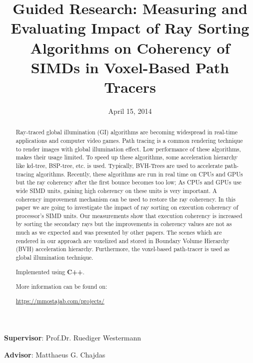 \documentclass[]{article}
\title{Guided Research: Measuring and Evaluating Impact of Ray Sorting Algorithms on Coherency of SIMDs in Voxel-Based Path Tracers}
\date{April 15, 2014}
\begin{document}
\maketitle

\begin{description}
	\centering
	\item[] \textbf{Supervisor}: Prof.Dr. Ruediger Westermann
	\item[] \textbf{Advisor}: Matthaeus G. Chajdas
\end{description}
	
	


\begin{abstract}

Ray-traced global illumination (GI) algorithms are becoming widespread in real-time applications and computer video games. Path tracing is a common rendering technique to render images with global illumination effect. Low performance of these algorithms, makes their usage limited. To speed up these algorithms, some acceleration hierarchy like kd-tree, BSP-tree, etc. is used. Typically, BVH-Trees are used to accelerate path-tracing algorithms. Recently, these algorithms are run in real time on CPUs and GPUs but the ray coherency after the first bounce becomes too low; As CPUs and GPUs use wide SIMD units, gaining high coherency on these units is very important. A coherency improvement mechanism can be used to restore the ray coherency. In this paper we are going to investigate the impact of ray sorting on execution coherency of processor’s SIMD units. Our measurements show that execution coherency is increased by sorting the secondary rays but the improvements in coherency values are not as much as we expected and was presented by other papers. The scenes which are rendered in our approach are voxelized and stored in Boundary Volume Hierarchy (BVH) acceleration hierarchy. Furthermore, the voxel-based path-tracer is used as global illumination technique.\newline{}

Implemented using \textbf{C++}.\newline{}

More information can be found on:\

\href{https://mmostajab.com/projects/}{https://mmostajab.com/projects/}\newline{}

\end{abstract}
\end{document}
